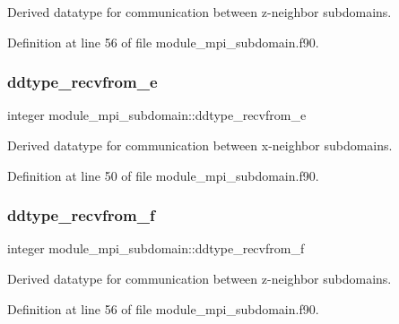 Derived datatype for communication between z-\/neighbor subdomains. 



Definition at line 56 of file module\+\_\+mpi\+\_\+subdomain.\+f90.

\mbox{\label{namespacemodule__mpi__subdomain_ab6299920e9e9fe15e9936e4be0bcfe7a}} 
\subsubsection{\texorpdfstring{ddtype\_recvfrom\_e}{ddtype\_recvfrom\_e}}
{\footnotesize\ttfamily integer module\+\_\+mpi\+\_\+subdomain\+::ddtype\+\_\+recvfrom\+\_\+e}



Derived datatype for communication between x-\/neighbor subdomains. 



Definition at line 50 of file module\+\_\+mpi\+\_\+subdomain.\+f90.

\mbox{\label{namespacemodule__mpi__subdomain_a1af70aeca9de9289ff16adbd2d6f8bd8}} 
\subsubsection{\texorpdfstring{ddtype\_recvfrom\_f}{ddtype\_recvfrom\_f}}
{\footnotesize\ttfamily integer module\+\_\+mpi\+\_\+subdomain\+::ddtype\+\_\+recvfrom\+\_\+f}



Derived datatype for communication between z-\/neighbor subdomains. 



Definition at line 56 of file module\+\_\+mpi\+\_\+subdomain.\+f90.

\mbox{\label{namespacemodule__mpi__subdomain_a200baef48d70fe5075d62807732c8db4}} 
